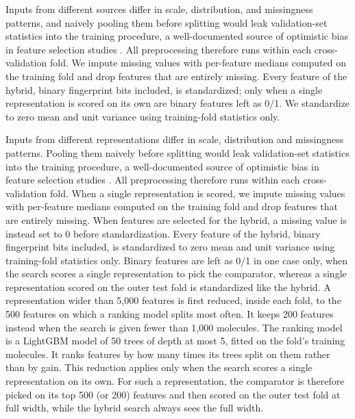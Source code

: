 Inputs from different sources differ in scale, distribution, and missingness patterns, and naively pooling them before splitting would leak validation-set statistics into the training procedure, a well-documented source of optimistic bias in feature selection studies \citep{Ambroise2002, Vabalas2019}. All preprocessing therefore runs within each cross-validation fold. We impute missing values with per-feature medians computed on the training fold and drop features that are entirely missing. Every feature of the hybrid, binary fingerprint bits included, is standardized; only when a single representation is scored on its own are binary features left as 0/1. We standardize to zero mean and unit variance using training-fold statistics only.

Inputs from different representations differ in scale, distribution and missingness patterns. Pooling them naively before splitting would leak validation-set statistics into the training procedure, a well-documented source of optimistic bias in feature selection studies \citep{Ambroise2002, Vabalas2019}. All preprocessing therefore runs within each cross-validation fold. When a single representation is scored, we impute missing values with per-feature medians computed on the training fold and drop features that are entirely missing. When features are selected for the hybrid, a missing value is instead set to 0 before standardization. Every feature of the hybrid, binary fingerprint bits included, is standardized to zero mean and unit variance using training-fold statistics only. Binary features are left as 0/1 in one case only, when the search scores a single representation to pick the comparator, whereas a single representation scored on the outer test fold is standardized like the hybrid. A representation wider than 5,000 features is first reduced, inside each fold, to the 500 features on which a ranking model splits most often. It keeps 200 features instead when the search is given fewer than 1,000 molecules. The ranking model is a LightGBM model of 50 trees of depth at most 5, fitted on the fold's training molecules. It ranks features by how many times its trees split on them rather than by gain. This reduction applies only when the search scores a single representation on its own. For such a representation, the comparator is therefore picked on its top 500 (or 200) features and then scored on the outer test fold at full width, while the hybrid search always sees the full width.

